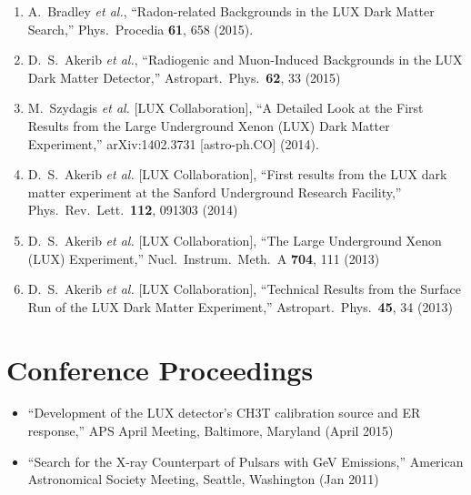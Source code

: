 \documentclass[a4paper,10pt]{article}
\begin{document}
\begin{enumerate}
\item   A.~Bradley {\it et al.},
  ``Radon-related Backgrounds in the LUX Dark Matter Search,''
  Phys.\ Procedia {\bf 61}, 658 (2015).
  
\item   D.~S.~Akerib {\it et al.},
  ``Radiogenic and Muon-Induced Backgrounds in the LUX Dark Matter Detector,''
  Astropart.\ Phys.\  {\bf 62}, 33 (2015)
  
\item   M.~Szydagis {\it et al.} [LUX Collaboration],
  ``A Detailed Look at the First Results from the Large Underground Xenon (LUX) Dark Matter Experiment,''  arXiv:1402.3731 [astro-ph.CO] (2014).
  
\item   D.~S.~Akerib {\it et al.} [LUX Collaboration],
  ``First results from the LUX dark matter experiment at the Sanford Underground Research Facility,''
  Phys.\ Rev.\ Lett.\  {\bf 112}, 091303 (2014)

\item   D.~S.~Akerib {\it et al.} [LUX Collaboration],
  ``The Large Underground Xenon (LUX) Experiment,''
  Nucl.\ Instrum.\ Meth.\ A {\bf 704}, 111 (2013)
 
\item   D.~S.~Akerib {\it et al.} [LUX Collaboration],
  ``Technical Results from the Surface Run of the LUX Dark Matter Experiment,''
  Astropart.\ Phys.\  {\bf 45}, 34 (2013)
   
\end{enumerate}

\section{Conference Proceedings}
\begin{itemize}

\item ``Development of the LUX detector's CH3T calibration source and ER response,'' APS April Meeting, Baltimore, Maryland (April 2015)

\item ``Search for the X-ray Counterpart of Pulsars with GeV Emissions,'' American Astronomical Society Meeting, Seattle, Washington (Jan 2011)

\end{itemize}
\end{document}
